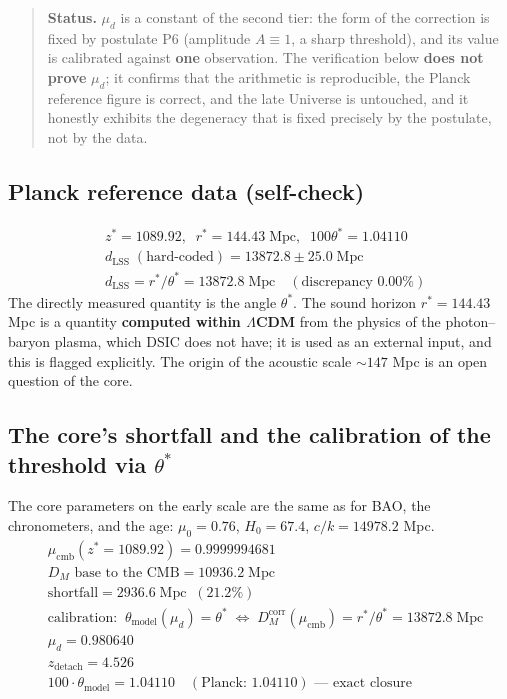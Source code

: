\documentclass[a4paper,10pt]{article}
\begin{document}
\begin{quote}
\textbf{Status.} $\mu_d$ is a constant of the second tier: the form of the correction is fixed by postulate P6 (amplitude $A \equiv 1$, a sharp threshold), and its value is calibrated against \textbf{one} observation. The verification below \textbf{does not prove} $\mu_d$; it confirms that the arithmetic is reproducible, the Planck reference figure is correct, and the late Universe is untouched, and it honestly exhibits the degeneracy that is fixed precisely by the postulate, not by the data.
\end{quote}

\subsection{Planck reference data (self-check)}

\begin{align*}
&z^* = 1089.92,\;\; r^* = 144.43\;\text{Mpc},\;\; 100\theta^* = 1.04110 \\
&d_{\text{LSS}}\;(\text{hard-coded}) = 13872.8 \pm 25.0\;\text{Mpc} \\
&d_{\text{LSS}} = r^*/\theta^* = 13872.8\;\text{Mpc} \quad (\text{discrepancy } 0.00\%)
\end{align*}
The directly measured quantity is the angle $\theta^*$. The sound horizon $r^* = 144.43$ Mpc is a quantity \textbf{computed within $\Lambda$CDM} from the physics of the photon--baryon plasma, which DSIC does not have; it is used as an external input, and this is flagged explicitly. The origin of the acoustic scale ${\sim}147$ Mpc is an open question of the core.

\subsection{The core's shortfall and the calibration of the threshold via $\theta^*$}

The core parameters on the early scale are the same as for BAO, the chronometers, and the age: $\mu_0 = 0.76$, $H_0 = 67.4$, $c/k = 14978.2$ Mpc.
\begin{align*}
&\mu_{\text{cmb}}(z^* = 1089.92) = 0.9999994681 \\
&D_M \text{ base to the CMB} = 10936.2\;\text{Mpc} \\
&\text{shortfall} = 2936.6\;\text{Mpc} \;\;(21.2\%) \\[4pt]
&\text{calibration:}\;\; \theta_{\text{model}}(\mu_d) = \theta^* \;\Leftrightarrow\; D_M^{\text{corr}}(\mu_{\text{cmb}}) = r^*/\theta^* = 13872.8\;\text{Mpc} \\
&\mu_d = 0.980640 \\
&z_{\text{detach}} = 4.526 \\
&100{\cdot}\theta_{\text{model}} = 1.04110 \quad (\text{Planck: } 1.04110) \text{ --- exact closure}
\end{align*}
\end{document}

